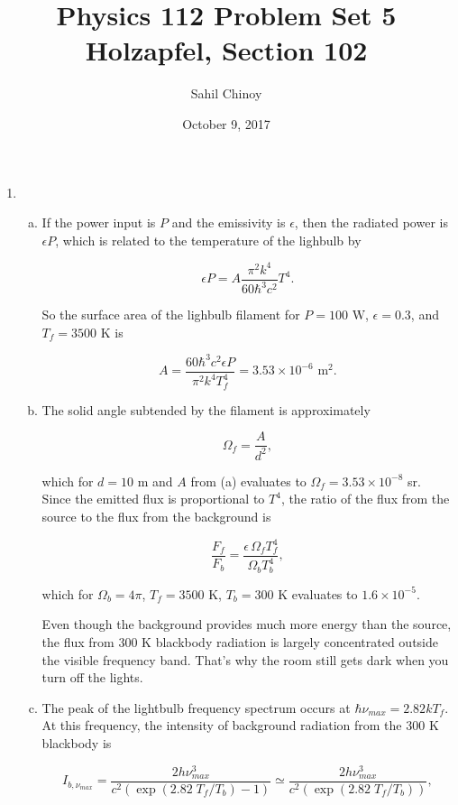\documentclass{article}
\title{Physics 112 Problem Set 5 \\ \large{Holzapfel, Section 102}}
\author{Sahil Chinoy}
\date{October 9, 2017}
\begin{document}
\maketitle{}

\begin{enumerate}

	\item

	\begin{enumerate}[(a)]

		\item

		If the power input is $P$ and the emissivity is $\epsilon$, then the radiated power is $\epsilon P$, which is related to the temperature of the lighbulb by

		$$\epsilon P = A \frac{\pi^2 k^4}{60 \hbar^3 c^2} T^4.$$

		So the surface area of the lighbulb filament for $P = 100 \text{ W}$, $\epsilon = 0.3$, and $T_f = 3500$ K is

		$$A = \frac{60 \hbar^3 c^2 \epsilon P}{\pi^2 k^4 T_f^4} = 3.53 \times 10^{-6} \text{ m}^2.$$

		\item 

		The solid angle subtended by the filament is approximately

		$$\Omega_f = \frac{A}{d^2},$$

		which for $d = 10$ m and $A$ from (a) evaluates to $\Omega_f = 3.53 \times 10^{-8}$ sr. Since the emitted flux is proportional to $T^4$, the ratio of the flux from the source to the flux from the background is

		$$\frac{F_f}{F_b} = \frac{\epsilon \, \Omega_f T_f^4}{\Omega_b T_b^4},$$

		which for $\Omega_b = 4\pi$, $T_f = 3500$ K, $T_b = 300$ K evaluates to $1.6 \times 10^{-5}$.

		Even though the background provides much more energy than the source, the flux from 300 K blackbody radiation is largely concentrated outside the visible frequency band. That's why the room still gets dark when you turn off the lights.

		\item

		The peak of the lightbulb frequency spectrum occurs at $\hbar \nu_{max} = 2.82 kT_f$. At this frequency, the intensity of background radiation from the 300 K blackbody is 

		$$I_{b, \nu_{max}} = \frac{2 h \nu_{max}^3}{c^2 (\exp(2.82 \; T_f / T_b)- 1)} \simeq \frac{2 h \nu_{max}^3}{c^2 (\exp(2.82 \; T_f / T_b))} ,$$


\end{enumerate}
\end{enumerate}
\end{document}

